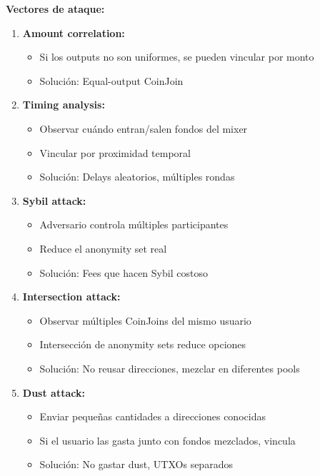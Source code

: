 \documentclass[11pt,a4paper,twoside]{book}
\begin{document}
\begin{remark}
\textbf{Vectores de ataque:}

\begin{enumerate}
    \item \textbf{Amount correlation:}
    \begin{itemize}
        \item Si los outputs no son uniformes, se pueden vincular por monto
        \item Soluci\'on: Equal-output CoinJoin
    \end{itemize}
    
    \item \textbf{Timing analysis:}
    \begin{itemize}
        \item Observar cu\'ando entran/salen fondos del mixer
        \item Vincular por proximidad temporal
        \item Soluci\'on: Delays aleatorios, m\'ultiples rondas
    \end{itemize}
    
    \item \textbf{Sybil attack:}
    \begin{itemize}
        \item Adversario controla m\'ultiples participantes
        \item Reduce el anonymity set real
        \item Soluci\'on: Fees que hacen Sybil costoso
    \end{itemize}
    
    \item \textbf{Intersection attack:}
    \begin{itemize}
        \item Observar m\'ultiples CoinJoins del mismo usuario
        \item Intersecci\'on de anonymity sets reduce opciones
        \item Soluci\'on: No reusar direcciones, mezclar en diferentes pools
    \end{itemize}
    
    \item \textbf{Dust attack:}
    \begin{itemize}
        \item Enviar peque\~nas cantidades a direcciones conocidas
        \item Si el usuario las gasta junto con fondos mezclados, vincula
        \item Soluci\'on: No gastar dust, UTXOs separados
    \end{itemize}
\end{enumerate}
\end{remark}
\end{document}
